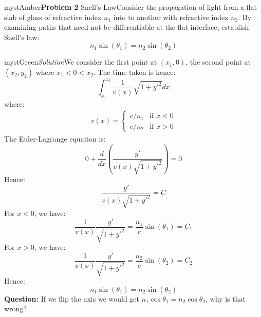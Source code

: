 \begin{mystadmonition}{mystAmber}{\textbf{Problem 2} Snell's Law}Consider the propagation of light from a flat slab of glass of refractive index $n_1$ into to
another with refractive index $n_2$. By examining paths that need not be differentiable
at the flat interface, establish Snell's law:
\begin{equation}
n_1\sin(\theta_1) = n_2\sin(\theta_2)
\end{equation}

\end{mystadmonition}
\begin{mystadmonition}{mystGreen}{\emph{Solution}}We consider the first point at $(x_1, 0)$, the second point at $(x_2,y_2)$ where $x_1<0<x_2$. The time taken is hence:
\begin{equation}
\int_{x_1}^{x_2} \frac{1}{v(x)}\sqrt{1+y'^2}dx
\end{equation}
where:
\begin{equation}
\begin{aligned}
v(x)=
\begin{cases}
    c/n_1 &\text{if } x<0 \\
    c/n_2 &\text{if } x>0
\end{cases}
\end{aligned}
\end{equation}
The Euler-Lagrange equation is:
\begin{equation}
0 + \frac{d}{dx}\left( \frac{y'}{v(x)\sqrt{1+y'^2}} \right)=0
\end{equation}
Hence:
\begin{equation}
\frac{y'}{v(x)\sqrt{1+y'^2}} =C
\end{equation}
For $x<0$, we have:
\begin{equation}
\frac{1}{v(x)}\frac{y'}{\sqrt{1+y'^2}} = \frac{n_1}{c}\sin(\theta_1) = C_1
\end{equation}
For $x>0$, we have:
\begin{equation}
\frac{1}{v(x)}\frac{y'}{\sqrt{1+y'^2}} = \frac{n_2}{c}\sin(\theta_2) = C_2
\end{equation}
Hence:
\begin{equation}
n_1\sin(\theta_1)=n_2\sin(\theta_2)
\end{equation}
\textbf{Question:} If we flip the axis we would get $n_1\cos\theta_1=n_2\cos\theta_2$, why is that wrong?

\end{mystadmonition}
